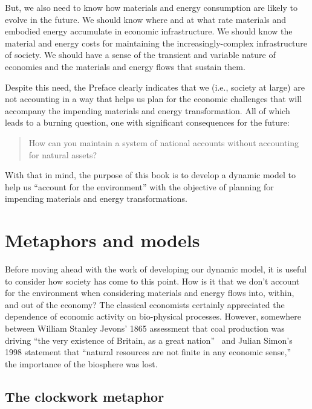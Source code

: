 But, we also need to know how materials and energy consumption 
are likely to evolve in the future.
We should know where and at what rate 
materials and embodied energy accumulate 
in economic infrastructure. 
We should know the material and energy costs for maintaining the
increasingly-complex infrastructure of society.
We should have a sense of the transient and variable nature of economies
and the materials and energy flows that sustain them.

Despite this need,
the Preface clearly indicates that we (i.e., society at large) 
are not accounting in a way that helps us plan 
for the economic challenges that will accompany 
the impending materials and energy transformation.
All of which leads to a burning question,
one with significant consequences for the future:

\begin{quote}
{\normalsize{How can you maintain a system of national accounts without 
accounting for natural assets?}}
\end{quote}

\noindent{}With that in mind, the purpose of this book is to 
develop a dynamic model to help us
``account for the environment''
with the objective of planning for impending materials and energy transformations.

\section{Metaphors and models}
\label{sec:metaphors_and_models}

Before moving ahead with the work of developing our dynamic model,
it is useful to consider how society has come to this point.
How is it that we don't account for the environment when 
considering materials and energy flows into, within, and out of the economy?
The classical economists certainly appreciated the dependence of
economic activity on bio-physical processes.\cite{Cleveland1987, Hall2011, Dale2012}
However, somewhere between William Stanley Jevons' 1865
assessment that
coal production was driving ``the very existence of Britain, as a great nation''~\cite[IV.3]{Jevons1865}
and Julian Simon's 1998 statement that
``natural resources are not finite in any economic sense,''~\cite[p.~54]{Simon1998} %
the importance of the biosphere was lost.


\subsection{The clockwork metaphor}
\label{sec:clockwork_metaphor}

